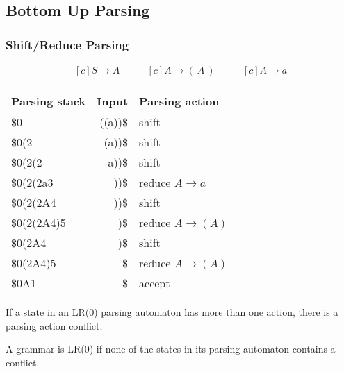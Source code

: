\subsection{Bottom Up Parsing}

\subsubsection{Shift/Reduce Parsing}
\begin{equation*}
    \begin{aligned}[c]
        S \rightarrow A
    \end{aligned}
    \qquad 
    \begin{aligned}[c]
        A \rightarrow (\ A\ )
    \end{aligned}
    \qquad 
    \begin{aligned}[c]
        A \rightarrow a
    \end{aligned}
\end{equation*}
\begin{center}
    \begin{tabular}{|lr|l|}
        \hline
        Parsing stack \hspace{0.5cm} & Input & Parsing action \\
        \hline
        \$0 & ((a))\$ & shift \\
        \$0(2 & (a))\$ & shift \\
        \$0(2(2 & a))\$ & shift \\
        \$0(2(2a3 & ))\$ & reduce $A \rightarrow a$ \\
        \$0(2(2A4 & ))\$ & shift \\
        \$0(2(2A4)5 & )\$ & reduce \( A \rightarrow (A)\) \\
        \$0(2A4 & )\$ & shift \\
        \$0(2A4)5 & \$ & reduce \( A \rightarrow (A)\) \\
        \$0A1 & \$ & accept \\
        \hline
    \end{tabular}
\end{center}


If a state in an LR(0) parsing automaton has more than one action, 
there is a parsing action conflict.

A grammar is LR(0) if none of the states in its parsing 
automaton contains a conflict.


